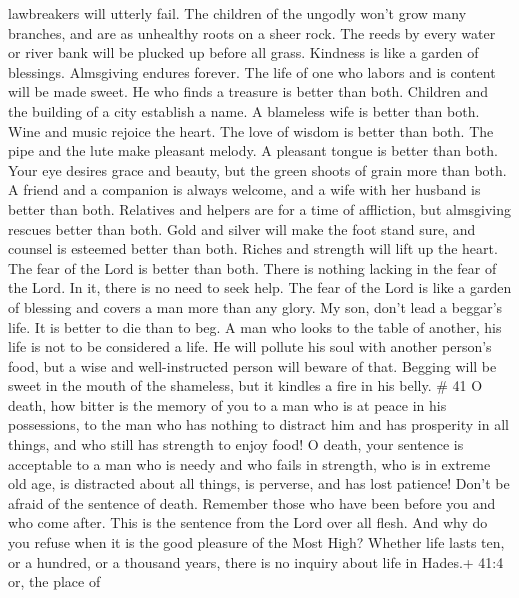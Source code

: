 lawbreakers will utterly fail.  The children of the ungodly
won't grow many branches, and are as unhealthy roots on a sheer rock.
 The reeds by every water or river bank will be plucked up
before all grass.  Kindness is like a garden of blessings.
Almsgiving endures forever.  The life of one who labors and
is content will be made sweet. He who finds a treasure is better than
both.  Children and the building of a city establish a
name. A blameless wife is better than both.  Wine and music
rejoice the heart. The love of wisdom is better than both. 
The pipe and the lute make pleasant melody. A pleasant tongue is better
than both.  Your eye desires grace and beauty, but the
green shoots of grain more than both.  A friend and a
companion is always welcome, and a wife with her husband is better than
both.  Relatives and helpers are for a time of affliction,
but almsgiving rescues better than both.  Gold and silver
will make the foot stand sure, and counsel is esteemed better than both.
 Riches and strength will lift up the heart. The fear of
the Lord is better than both. There is nothing lacking in the fear of
the Lord. In it, there is no need to seek help.  The fear
of the Lord is like a garden of blessing and covers a man more than any
glory.  My son, don't lead a beggar's life. It is better to
die than to beg.  A man who looks to the table of another,
his life is not to be considered a life. He will pollute his soul with
another person's food, but a wise and well-instructed person will beware
of that.  Begging will be sweet in the mouth of the
shameless, but it kindles a fire in his belly. \# 41  O
death, how bitter is the memory of you to a man who is at peace in his
possessions, to the man who has nothing to distract him and has
prosperity in all things, and who still has strength to enjoy food!
 O death, your sentence is acceptable to a man who is needy
and who fails in strength, who is in extreme old age, is distracted
about all things, is perverse, and has lost patience!  Don't
be afraid of the sentence of death. Remember those who have been before
you and who come after. This is the sentence from the Lord over all
flesh.  And why do you refuse when it is the good pleasure
of the Most High? Whether life lasts ten, or a hundred, or a thousand
years, there is no inquiry about life in Hades.+ 41:4 or, the place of

